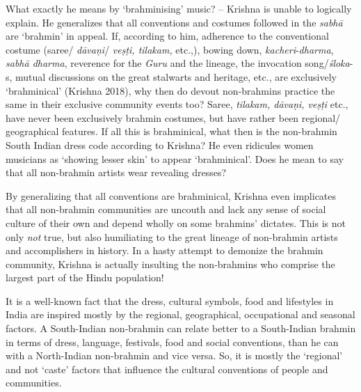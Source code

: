 What exactly he means by ‘brahminising’ music? – Krishna is unable to logically explain. He generalizes that all conventions and costumes followed in the \textit{sabhā} are ‘brahmin’ in appeal. If, according to him, adherence to the conventional costume (saree/ \textit{dāvaṇi}/ \textit{veṣṭi, tilakam,} etc.,), bowing down, \textit{kacheri}-\textit{dharma}, \textit{sabhā dharma}, reverence for the \textit{Guru} and the lineage, the invocation song/\textit{śloka}-s, mutual discussions on the great stalwarts and heritage, etc., are exclusively ‘brahminical’ (Krishna 2018), why then do devout non-brahmins practice the same in their exclusive community events too? Saree, \textit{tilakam, dāvaṇi, veṣṭi} etc., have never been exclusively brahmin costumes, but have rather been regional/ geographical features. If all this is brahminical, what then is the non-brahmin South Indian dress code according to Krishna? He even ridicules women musicians as ‘showing lesser skin’ to appear ‘brahminical’. Does he mean to say that all non-brahmin artists wear revealing dresses?

By generalizing that all conventions are brahminical, Krishna even implicates that all non-brahmin communities are uncouth and lack any sense of social culture of their own and depend wholly on some brahmins’ dictates. This is not only \textit{not} true, but also humiliating to the great lineage of non-brahmin artists and accomplishers in history. In a hasty attempt to demonize the brahmin community, Krishna is actually insulting the non-brahmins who comprise the largest part of the Hindu population!

It is a well-known fact that the dress, cultural symbols, food and lifestyles in India are inspired mostly by the regional, geographical, occupational and seasonal factors. A South-Indian non-brahmin can relate better to a South-Indian brahmin in terms of dress, language, festivals, food and social conventions, than he can with a North-Indian non-brahmin and vice versa. So, it is mostly the ‘regional’ and not ‘caste’ factors that influence the cultural conventions of people and communities.


